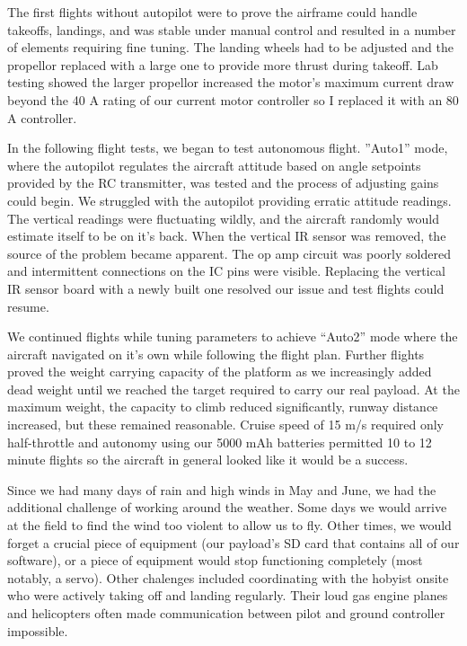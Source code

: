 \documentclass[a4paper,11pt]{report}
\begin{document}
The first flights without autopilot were to prove the airframe could handle takeoffs, landings, and was stable under manual control and resulted in a number of elements requiring fine tuning. The landing wheels had to be adjusted and the propellor replaced with a large one to provide more thrust during takeoff. Lab testing showed the larger propellor increased the motor's maximum current draw beyond the 40 A rating of our current motor controller so I replaced it with an 80 A controller. 

In the following flight tests, we began to test autonomous flight. ''Auto1'' mode, where the autopilot regulates the aircraft attitude based on angle setpoints provided by the RC transmitter, was tested and the process of adjusting gains could begin. We struggled with the autopilot providing erratic attitude readings. The vertical readings were fluctuating wildly, and the aircraft randomly would estimate itself to be on it's back. When the vertical IR sensor was removed, the source of the problem became apparent. The op amp circuit was poorly soldered and intermittent connections on the IC pins were visible. Replacing the vertical IR sensor board with a newly built one resolved our issue and test flights could resume.

We continued flights while tuning parameters to achieve ``Auto2'' mode where the aircraft navigated on it's own while following the flight plan. Further flights proved the weight carrying capacity of the platform as we increasingly added dead weight until we reached the target required to carry our real payload. At the maximum weight, the capacity to climb reduced significantly, runway distance increased, but these remained reasonable. Cruise speed of 15 m/s required only half-throttle and autonomy using our 5000 mAh batteries permitted 10 to 12 minute flights so the aircraft in general looked like it would be a success.

Since we had many days of rain and high winds in May and June, we had the additional challenge of working around the weather. Some days we would arrive at the field to find the wind too violent to allow us to fly. Other times, we would forget a crucial piece of equipment (our payload's SD card that contains all of our software), or a piece of equipment would stop functioning completely (most notably, a servo). Other chalenges included coordinating with the hobyist onsite who were actively taking off and landing regularly. Their loud gas engine planes and helicopters often made communication between pilot and ground controller impossible.
\end{document}
